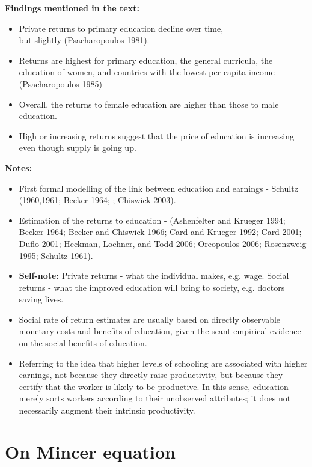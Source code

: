 \textbf{Findings mentioned in the text:}

\begin{itemize}
    \item Private returns to primary education decline over time,\\
    but slightly (Psacharopoulos 1981).
    \item Returns are highest for primary education,
    the general curricula, the education of women, and countries with the lowest per capita
    income (Psacharopoulos 1985)
    \item Overall, the returns to female education are higher than those to male
    education.
    \item High or increasing returns suggest that the price of education is increasing even
    though supply is going up.
\end{itemize}

\textbf{Notes:}
\begin{itemize}
    \item First formal modelling of the link between education and earnings - Schultz (1960,1961; Becker 1964; \cite{mincer1974schooling}; Chiswick 2003).
    \item Estimation of the returns to education - (Ashenfelter and
    Krueger 1994; Becker 1964; Becker and Chiswick 1966; Card and Krueger 1992; Card 2001; Duflo 2001;
    Heckman, Lochner, and Todd 2006; Oreopoulos 2006; Rosenzweig 1995; Schultz 1961).
    \item \textbf{Self-note:} Private returns - what the individual makes, e.g. wage. Social returns - what the improved education will bring to society, e.g. doctors saving lives.
    \item Social rate of return estimates are usually based on directly observable monetary costs and
    benefits of education, given the scant empirical evidence on the social benefits of education.
    \item Referring to the idea that higher levels of schooling are associated
    with higher earnings, not because they directly raise productivity, but because they certify that the
    worker is likely to be productive. In this sense, education merely sorts workers according to their
    unobserved attributes; it does not necessarily augment their intrinsic productivity.
\end{itemize}

\clearpage

\section*{On Mincer equation}

